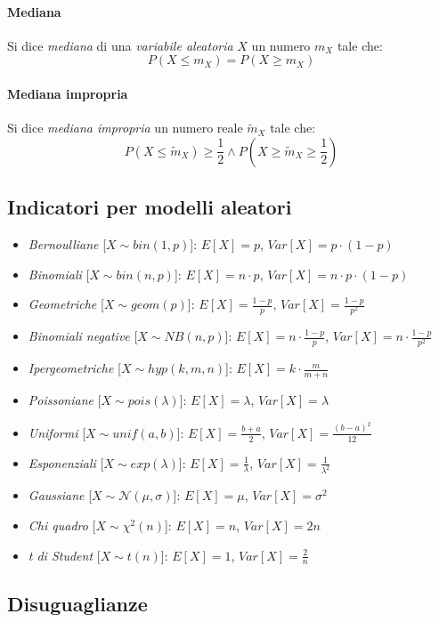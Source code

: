 \documentclass[12pt, a4paper]{report}
\theoremstyle{definition}
\begin{document}
\paragraph{Mediana}
Si dice \emph{mediana} di una \emph{variabile aleatoria} $X$ un numero $m_X$
tale che:
\[P(X\leq m_X)=P(X\geq m_X)\]
\paragraph{Mediana impropria}
Si dice \emph{mediana impropria} un numero reale $\tilde{m}_X$ tale che:
\[P(X\leq\tilde{m}_X)\geq\frac{1}{2}\wedge P(X\geq\tilde{m}_X\geq\frac{1}{2})\]

\subsection{Indicatori per modelli aleatori}
\begin{itemize}
    \item \emph{Bernoulliane} [$X\sim bin(1,p)$]: $E[X]=p$, $Var[X]=p\cdot(1-p)$
    \item \emph{Binomiali} [$X\sim bin(n,p)$]: $E[X]=n\cdot p$, $Var[X]=n\cdot p
    \cdot(1-p)$
    \item \emph{Geometriche} [$X\sim geom(p)$]: $E[X]=\frac{1-p}{p}$, $Var[X]=
    \frac{1-p}{p^2}$
    \item \emph{Binomiali negative} [$X\sim NB(n,p)$]: $E[X]=n\cdot\frac{1-p}{p}$,
    $Var[X]=n\cdot\frac{1-p}{p^2}$
    \item \emph{Ipergeometriche} [$X\sim hyp(k,m,n)$]: $E[X]=k\cdot\frac{m}{m+n}$
    \item \emph{Poissoniane} [$X\sim pois(\lambda)$]: $E[X]=\lambda$, $Var[X]=\lambda$
    \item \emph{Uniformi} [$X\sim unif(a,b)$]: $E[X]=\frac{b+a}{2}$, $Var[X]=
    \frac{(b-a)^2}{12}$
    \item \emph{Esponenziali} [$X\sim exp(\lambda)$]: $E[X]=\frac{1}{\lambda}$,
    $Var[X]=\frac{1}{\lambda^2}$
    \item \emph{Gaussiane} [$X\sim\mathcal{N}(\mu,\sigma)$]: $E[X]=\mu$, $Var[X]=
    \sigma^2$
    \item \emph{Chi quadro} [$X\sim\chi^2(n)$]: $E[X]=n$, $Var[X]=2n$
    \item \emph{t di Student} [$X\sim t(n)$]: $E[X]=1$, $Var[X]=\frac{2}{n}$
\end{itemize}

\subsection{Disuguaglianze}
\end{document}
